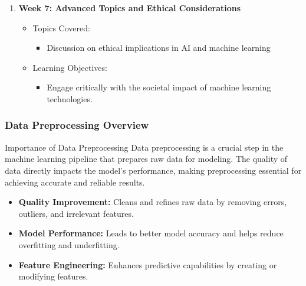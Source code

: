 \documentclass[aspectratio=169]{beamer}
\begin{document}
\begin{frame}[fragile]
\begin{enumerate}
    \item \textbf{Week 7: Advanced Topics and Ethical Considerations}
      \begin{itemize}
        \item Topics Covered:
        \begin{itemize}
          \item Discussion on ethical implications in AI and machine learning
        \end{itemize}
        \item Learning Objectives:
        \begin{itemize}
          \item Engage critically with the societal impact of machine learning technologies.
        \end{itemize}
      \end{itemize}
  \end{enumerate}
\end{frame}

\begin{frame}[fragile]
    \frametitle{Data Preprocessing Overview}
    \begin{block}{Importance of Data Preprocessing}
        Data preprocessing is a crucial step in the machine learning pipeline that prepares raw data for modeling. The quality of data directly impacts the model's performance, making preprocessing essential for achieving accurate and reliable results.
    \end{block}
    
    \begin{itemize}
        \item \textbf{Quality Improvement:} Cleans and refines raw data by removing errors, outliers, and irrelevant features.
        \item \textbf{Model Performance:} Leads to better model accuracy and helps reduce overfitting and underfitting.
        \item \textbf{Feature Engineering:} Enhances predictive capabilities by creating or modifying features.
    \end{itemize}
\end{frame}
\end{document}
